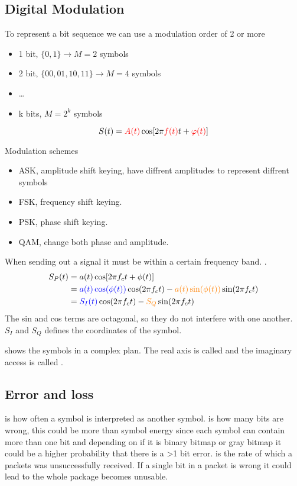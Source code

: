 \subsection{Digital Modulation}
To represent a bit sequence we can use a modulation order of 2 or more
\begin{itemize}
    \item 1 bit, $\{0,1\} \to M = 2$ symbols
    \item 2 bit, $\{00,01,10,11\} \to M = 4$ symbols
    \item \ldots
    \item k bits, $M = 2^k$ symbols
\end{itemize}

\begin{equation}
    S(t) = \textcolor{red}{A(t)}\cos[2\pi \textcolor{red}{f(t)}t + \textcolor{red}{\varphi(t)}] \\
\end{equation}

Modulation schemes
\begin{itemize}
    \item ASK, amplitude shift keying, have diffrent amplitudes to represent diffrent symbols
    \item FSK, frequency shift keying.
    \item PSK, phase shift keying.
    \item QAM, change both phase and amplitude.
\end{itemize}

When sending out a signal it must be within a certain frequency band.
.
\begin{align}
    S_P(t) &= a(t)\cos[2\pi f_c t + \phi(t) ] \\
           &= \textcolor{blue}{a(t)\cos(\phi(t))}\cos(2\pi f_c t) - \textcolor{orange}{a(t)\sin(\phi(t))}\sin(2\pi f_c t) \\
           &= \textcolor{blue}{S_I(t)}\cos(2\pi f_c t) - \textcolor{orange}{S_Q}\sin(2\pi f_c t)
\end{align}
The sin and cos terms are octagonal, so they do not interfere with one another.
$S_I$ and $S_Q$ defines the coordinates of the symbol.

 shows the symbols in a complex plan. The real axis is called  and the 
imaginary access is called .


\subsection{Error and loss}
 is how often a symbol is interpreted as another symbol.
 is how many bits are wrong, this could be more than symbol energy since each 
symbol can contain more than one bit and depending on if it is binary bitmap or gray bitmap it could be 
a higher probability that there is a >1 bit error.
 is the rate of which a packets was unsuccessfully received.
If a single bit in a packet is wrong it could lead to the whole package becomes unusable.

